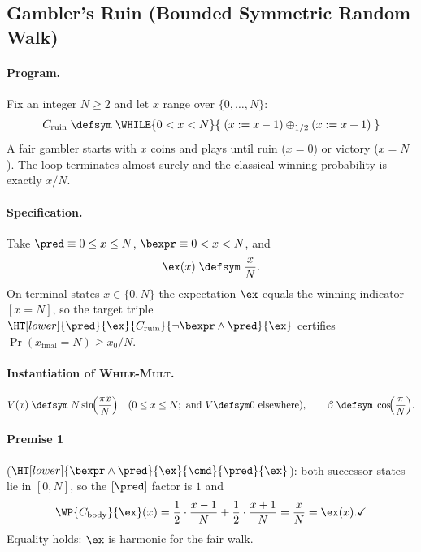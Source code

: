 \subsection{Gambler's Ruin (Bounded Symmetric Random Walk)}%
\label{app:bench-ruin}

\paragraph{Program.}
Fix an integer $N \geq 2$ and let $x$ range over $\{0,\dots,N\}$:
\[
  C_{\text{ruin}} \;\defsym\;
  \WHILE{0 \lt x \lt N}{\;
    (x \mathrel{:=} x-1) \oplus_{1/2} (x \mathrel{:=} x+1)
  \;}
\]
A fair gambler starts with $x$ coins and plays until ruin ($x = 0$) or
victory ($x = N$). The loop terminates almost surely and the classical
winning probability is exactly $x/N$.

\paragraph{Specification.}
Take $\pred \equiv 0 \leq x \leq N$, $\bexpr \equiv 0 \lt x \lt N$, and
\[
  \ex(x) \;\defsym\; \frac{x}{N}.
\]
On terminal states $x \in \{0, N\}$ the expectation $\ex$ equals the winning
indicator $[x = N]$, so the target triple
$\HT[lower]{\pred}{\ex}{C_{\text{ruin}}}{\neg\bexpr\land\pred}{\ex}$
certifies $\Pr(x_{\text{final}} = N) \geq x_0/N$.

\paragraph{Instantiation of \textsc{While-Mult}.}
\[
  V(x) \;\defsym\; N \sin\!\Bigl(\frac{\pi x}{N}\Bigr)
  \quad (0 \leq x \leq N; \text{ and } V \defsym 0 \text{ elsewhere}),
  \qquad
  \beta \;\defsym\; \cos\!\Bigl(\frac{\pi}{N}\Bigr).
\]

\paragraph{Premise 1} ($\HT[lower]{\bexpr\land\pred}{\ex}{\cmd}{\pred}{\ex}$):
both successor states lie in $[0,N]$, so the $[\pred]$ factor is $1$ and
\[
  \WP{C_{\text{body}}}{\ex}(x)
  = \frac{1}{2}\cdot\frac{x-1}{N} + \frac{1}{2}\cdot\frac{x+1}{N}
  = \frac{x}{N}
  = \ex(x).
  \checkmark
\]
Equality holds: $\ex$ is harmonic for the fair walk.

